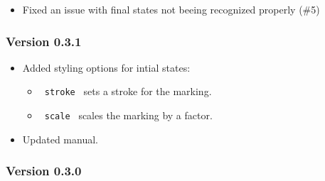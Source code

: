 \begin{itemize}
\tightlist
\item
  Fixed an issue with final states not beeing recognized properly (\#5)
\end{itemize}

\subsubsection{Version 0.3.1}\label{version-0.3.1}

\begin{itemize}
\tightlist
\item
  Added styling options for intial states:

  \begin{itemize}
  \tightlist
  \item
    \texttt{\ stroke\ } sets a stroke for the marking.
  \item
    \texttt{\ scale\ } scales the marking by a factor.
  \end{itemize}
\item
  Updated manual.
\end{itemize}

\subsubsection{Version 0.3.0}\label{version-0.3.0}

